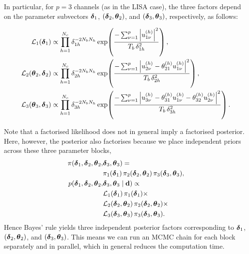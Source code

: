 \documentclass[%
	reprint,
	nofootinbib,
	amsmath,
	amssymb,
	aps,
]{revtex4-2}
\renewcommand{\d}{{\bf d}}
\newcommand{\btheta}{\mbox{\boldmath $\theta$}}
\newcommand{\bdelta}{\mbox{\boldmath $\delta$}}
\begin{document}
	In particular, for $p=3$ channels (as in the LISA case), the three
	factors depend on the parameter subvectors $\bdelta_{1}$,
	$(\bdelta_{2},\btheta_{2})$, and $(\bdelta_{3},\btheta_{3})$,
	respectively, as follows:
	\begin{widetext}
	\begin{align}
		\mathcal{L}_{1}(\bdelta_{1})
		&\propto \prod_{h=1}^{N_{c}}\delta_{1h}^{-2N_{b}N_{h}}
		  \exp\!\left(\frac{-\sum_{\nu=1}^{p}\left|u_{1\nu}^{(h)}\right|^{2}}
		              {T_{b}\,\delta_{1h}^{2}}\right), \label{eq:likelihood1}\\
		\mathcal{L}_{2}(\btheta_{2},\bdelta_{2})
		&\propto \prod_{h=1}^{N_{c}}\delta_{2h}^{-2N_{b}N_{h}}
		  \exp\!\left(\frac{-\sum_{\nu=1}^{p}\left|u_{2\nu}^{(h)}-\theta_{21}^{(h)}u_{1\nu}^{(h)}\right|^{2}}
		              {T_{b}\,\delta_{2h}^{2}}\right), \label{eq:likelihood2}\\
		\mathcal{L}_{3}(\btheta_{3},\bdelta_{3})
		&\propto \prod_{h=1}^{N_{c}}\delta_{3h}^{-2N_{b}N_{h}}
		  \exp\!\left(\frac{-\sum_{\nu=1}^{p}\left|u_{3\nu}^{(h)}-\theta_{31}^{(h)}u_{1\nu}^{(h)}-\theta_{32}^{(h)}u_{2\nu}^{(h)}\right|^{2}}
		              {T_{b}\,\delta_{3h}^{2}}\right). \label{eq:likelihood3}
	\end{align}
	\end{widetext}%
	Note that a factorised likelihood does not in general imply a factorised
	posterior. Here, however, the posterior also factorises because we place independent
	priors across these three parameter blocks,
	\begin{align}
		\pi(\bdelta_{1},\bdelta_{2},\btheta_{2}, & \bdelta_{3},\btheta_{3}) = \notag                                                                         \\
		                                         & \pi_{1}(\bdelta_{1})\,\pi_{2}(\bdelta_{2},\btheta_{2})\,\pi_{3}(\bdelta_{3},\btheta_{3}),                             \\
		p(\bdelta_{1},\bdelta_{2},\btheta_{2},   & \bdelta_{3},\btheta_{3}\mid \d) \propto \notag                                    \\
		                                         & \mathcal{L}_{1}(\bdelta_{1})\,\pi_{1}(\bdelta_{1})\times \notag                                  \\
		                                         & \mathcal{L}_{2}(\bdelta_{2},\btheta_{2})\,\pi_{2}(\bdelta_{2},\btheta_{2})\times \notag \\
		                                         & \mathcal{L}_{3}(\bdelta_{3},\btheta_{3})\,\pi_{3}(\bdelta_{3},\btheta_{3}).
	\end{align}
	Hence Bayes' rule yields three independent posterior factors corresponding to $\bdelta
	_{1}$, $(\bdelta_{2},\btheta_{2})$, and $(\bdelta_{3},\btheta_{3})$. This
	means we can run an MCMC chain for each block separately and in parallel, which
	in general reduces the computation time.
\end{document}
